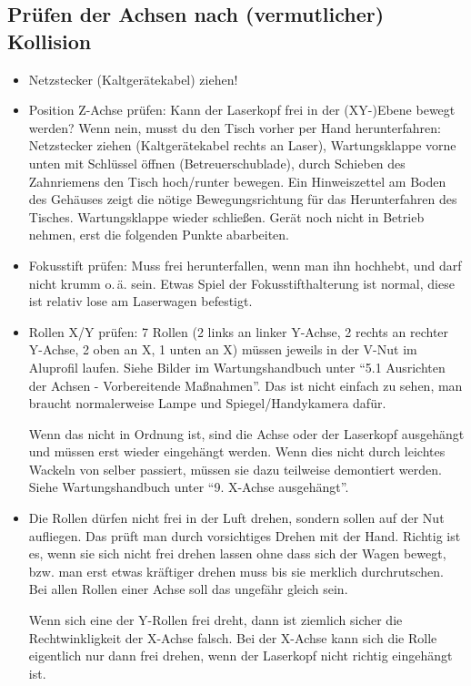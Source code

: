 \documentclass{\basedir/fablab-document}
\begin{document}
\subsection{Prüfen der Achsen nach (vermutlicher) Kollision} \label{sec:wartung-ltt:kollision}
	\begin{itemize}
		\item Netzstecker (Kaltgerätekabel) ziehen!
		\item Position Z-Achse prüfen: Kann der Laserkopf frei in der (XY-)Ebene bewegt werden? Wenn nein, musst du den Tisch vorher per Hand herunterfahren: Netzstecker ziehen (Kaltgerätekabel rechts an Laser), Wartungsklappe vorne unten mit Schlüssel öffnen (Betreuerschublade), durch Schieben des Zahnriemens den Tisch hoch/runter bewegen. Ein Hinweiszettel am Boden des Gehäuses zeigt die nötige Bewegungsrichtung für das Herunterfahren des Tisches. Wartungsklappe wieder schließen. Gerät noch nicht in Betrieb nehmen, erst die folgenden Punkte abarbeiten.
		\item Fokusstift prüfen: Muss frei herunterfallen, wenn man ihn hochhebt, und darf nicht krumm o.\,ä. sein. Etwas Spiel der Fokusstifthalterung ist normal, diese ist relativ lose am Laserwagen befestigt.
		\item Rollen X/Y prüfen: 7 Rollen (2 links an linker Y-Achse, 2 rechts an rechter Y-Achse, 2 oben an X, 1 unten an X) müssen jeweils in der V-Nut im Aluprofil laufen. Siehe Bilder im Wartungshandbuch unter \enquote{5.1 Ausrichten der Achsen - Vorbereitende Maßnahmen}. Das ist nicht einfach zu sehen, man braucht normalerweise Lampe und Spiegel/Handykamera dafür.

		Wenn das nicht in Ordnung ist, sind die Achse oder der Laserkopf ausgehängt und müssen erst wieder eingehängt werden. Wenn dies nicht durch leichtes Wackeln von selber passiert, müssen sie dazu teilweise demontiert werden. Siehe Wartungshandbuch unter \enquote{9. X-Achse ausgehängt}.
		\item Die Rollen dürfen nicht frei in der Luft drehen, sondern sollen auf der Nut aufliegen. Das prüft man durch vorsichtiges Drehen mit der Hand. Richtig ist es, wenn sie sich nicht frei drehen lassen ohne dass sich der Wagen bewegt, bzw. man erst etwas kräftiger drehen muss bis sie merklich durchrutschen. 	Bei allen Rollen einer Achse soll das ungefähr gleich sein.

		Wenn sich eine der Y-Rollen frei dreht, dann ist ziemlich sicher die Rechtwinkligkeit der X-Achse falsch. Bei der X-Achse kann sich die Rolle eigentlich nur dann frei drehen, wenn der Laserkopf nicht richtig eingehängt ist.



\end{itemize}
\end{document}
